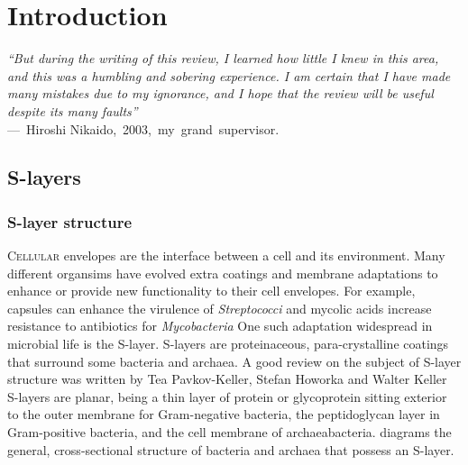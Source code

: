   \chapter{Introduction} 
\label{ch:Introduction}

\begin{epigraph} \emph{``But during the writing of this review, I learned how little I knew in this area, and this was a humbling and sobering experience. I am certain that I have
made many mistakes due to my ignorance, and I hope that the review will be useful despite its many faults''}\\ ---~Hiroshi Nikaido,~2003,~my~grand~supervisor.
\end{epigraph}
\section{S-layers} \label{sec:intro-slayers}
\subsection{S-layer structure} %
\label{sub:s_layer_structure} \lettrine[lines=2]{C}{ellular} envelopes are the interface between a cell and its environment. Many different organsims have evolved extra coatings
and membrane adaptations to enhance or provide new functionality to their cell envelopes. For example, capsules can enhance the virulence of
\textit{Streptococci} and mycolic acids increase resistance to antibiotics for \textit{Mycobacteria} One such
adaptation widespread in microbial life is the \ac{S-layer}. \Acp{S-layer} are proteinaceous, para-crystalline coatings that surround some bacteria and
archaea. A good review on the subject of \ac{S-layer} structure was written by Tea Pavkov-Keller, Stefan Howorka and Walter
Keller \Acp{S-layer} are planar, being a thin layer of protein or glycoprotein sitting exterior to the outer membrane for Gram-negative bacteria, the
peptidoglycan layer in Gram-positive bacteria, and the cell membrane of archaeabacteria.  diagrams the general, cross-sectional structure of bacteria and
archaea that possess an S-layer.

